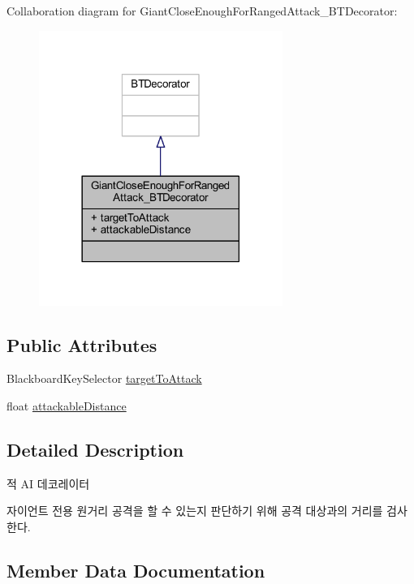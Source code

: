 Collaboration diagram for Giant\+Close\+Enough\+For\+Ranged\+Attack\+\_\+\+B\+T\+Decorator\+:
\nopagebreak
\begin{figure}[H]
\begin{center}
\leavevmode
\includegraphics[width=225pt]{class_giant_close_enough_for_ranged_attack___b_t_decorator__coll__graph}
\end{center}
\end{figure}
\subsection*{Public Attributes}
\begin{DoxyCompactItemize}
\item 
Blackboard\+Key\+Selector \hyperlink{class_giant_close_enough_for_ranged_attack___b_t_decorator_a1cc248f03397ce0e086ac9b16bd732e1}{target\+To\+Attack}
\item 
float \hyperlink{class_giant_close_enough_for_ranged_attack___b_t_decorator_a994ad90e6d00df363f635eee1fcf2146}{attackable\+Distance}
\end{DoxyCompactItemize}


\subsection{Detailed Description}
적 AI 데코레이터 

자이언트 전용 원거리 공격을 할 수 있는지 판단하기 위해 공격 대상과의 거리를 검사한다. 

\subsection{Member Data Documentation}

